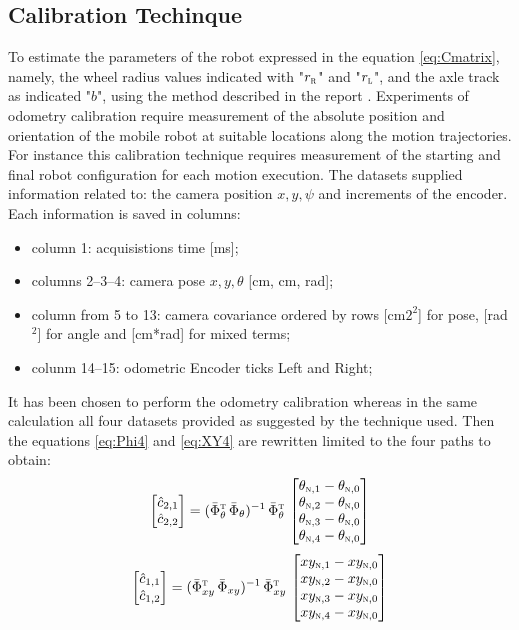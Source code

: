 \subsection{Calibration Techinque}
To estimate the parameters of the robot expressed in the equation \ref{eq:Cmatrix}, namely, the wheel radius values indicated with "$r_\textsc{r}$" and "$r_\textsc{l}$", and the axle track as indicated "$b$", using the method described in the report \cite{1512356}.
Experiments of odometry calibration require measurement of the absolute position and orientation of the mobile robot at suitable locations along the motion trajectories. For instance this calibration technique requires measurement of the starting and final robot configuration for each motion execution. The datasets supplied information related to: the camera position $x, y, \psi$ and increments of the encoder.
Each information is saved in columns:
\begin{itemize}
\item column 1: acquisistions time [ms];
\item columns 2--3--4: camera pose $x, y, \theta$ [cm, cm, rad];
\item column from 5 to 13: camera covariance ordered by rows [cm$2^2$] for pose, [rad$^2$] for angle and [cm*rad] for mixed terms;
\item colunm 14--15: odometric Encoder ticks Left and Right;
\end{itemize}
It has been chosen to perform the odometry calibration whereas in the same calculation all four datasets provided as suggested by the technique used. Then the equations \ref{eq:Phi4} and \ref{eq:XY4} are rewritten limited to the four paths to obtain:
\begin{equation}
\label{eq:Phi4}
	\begin{bmatrix}
		\hat{c}_{2,1}\\
		\hat{c}_{2,2}
	\end{bmatrix} =	(\bar{\Phi}_{\theta}^{\textsc{t}} \, \bar{\Phi}_{\theta})^{-1} \, \bar{\Phi}_{\theta}^{\textsc{t}} \, 
	\begin{bmatrix}
		\theta_{\textsc{n},1} - \theta_{\textsc{n},0}\\
		\theta_{\textsc{n},2} - \theta_{\textsc{n},0}\\
		\theta_{\textsc{n},3} - \theta_{\textsc{n},0}\\
		\theta_{\textsc{n},4} - \theta_{\textsc{n},0}
	\end{bmatrix}
\end{equation}
\begin{equation}
\label{eq:XY4}
	\begin{bmatrix}
		\hat{c}_{1,1}\\
		\hat{c}_{1,2}
	\end{bmatrix} = (\bar{\Phi}_{xy}^{\textsc{t}} \, \bar{\Phi}_{xy})^{-1} \, \bar{\Phi}_{xy}^{\textsc{t}} \, 
	\begin{bmatrix}
		xy_{\textsc{n},1} - xy_{\textsc{n},0}\\
		xy_{\textsc{n},2} - xy_{\textsc{n},0}\\
		xy_{\textsc{n},3} - xy_{\textsc{n},0}\\
		xy_{\textsc{n},4} - xy_{\textsc{n},0}
	\end{bmatrix}
\end{equation}
